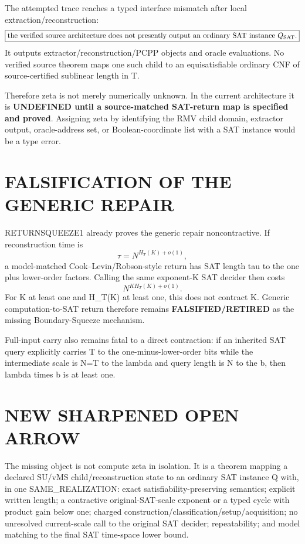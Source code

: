 \documentclass[11pt]{article}
\begin{document}
The attempted trace reaches a typed interface mismatch after local extraction/reconstruction:
\[
\boxed{\text{the verified source architecture does not presently output an ordinary SAT instance }Q_{\rm SAT}.}
\]
It outputs extractor/reconstruction/PCPP objects and oracle evaluations. No verified source theorem maps one such child to an equisatisfiable ordinary CNF of source-certified sublinear length in T.

Therefore zeta is not merely numerically unknown. In the current architecture it is \textbf{UNDEFINED until a source-matched SAT-return map is specified and proved}. Assigning zeta by identifying the RMV child domain, extractor output, oracle-address set, or Boolean-coordinate list with a SAT instance would be a type error.

\section*{FALSIFICATION OF THE GENERIC REPAIR}
RETURNSQUEEZE1 already proves the generic repair noncontractive. If reconstruction time is
\[
\tau=N^{H_T(K)+o(1)},
\]
a model-matched Cook--Levin/Robson-style return has SAT length tau to the one plus lower-order factors. Calling the same exponent-K SAT decider then costs
\[
N^{K H_T(K)+o(1)}.
\]
For K at least one and H_T(K) at least one, this does not contract K. Generic computation-to-SAT return therefore remains \textbf{FALSIFIED/RETIRED} as the missing Boundary-Squeeze mechanism.

Full-input carry also remains fatal to a direct contraction: if an inherited SAT query explicitly carries T to the one-minus-lower-order bits while the intermediate scale is N=T to the lambda and query length is N to the b, then lambda times b is at least one.

\section*{NEW SHARPENED OPEN ARROW}
The missing object is not compute zeta in isolation. It is a theorem mapping a declared SU/vMS child/reconstruction state to an ordinary SAT instance Q with, in one SAME_REALIZATION: exact satisfiability-preserving semantics; explicit written length; a contractive original-SAT-scale exponent or a typed cycle with product gain below one; charged construction/classification/setup/acquisition; no unresolved current-scale call to the original SAT decider; repeatability; and model matching to the final SAT time-space lower bound.
\end{document}
